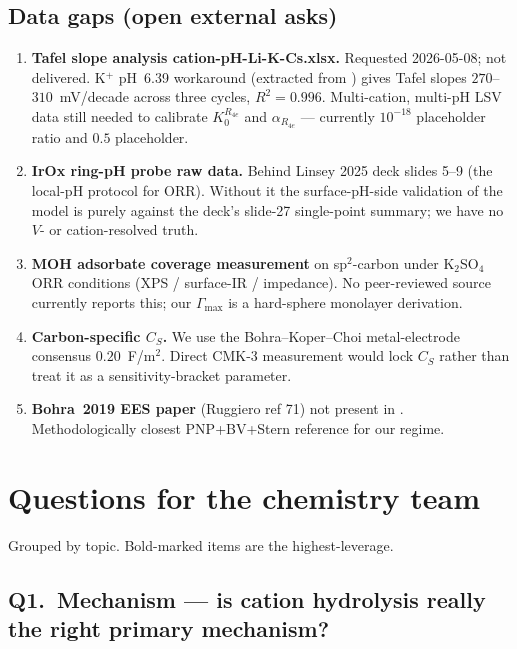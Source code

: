 \documentclass[11pt]{article}
\begin{document}
\subsection{Data gaps (open external asks)}

\begin{enumerate}[leftmargin=*,nosep]
\item \textbf{Tafel slope analysis cation-pH-Li-K-Cs.xlsx.}  Requested
  2026-05-08; not delivered.  K$^+$ pH~6.39 workaround
  (extracted from ) gives Tafel
  slopes $270$--$310$~mV/decade across three cycles, $R^2=0.996$.
  Multi-cation, multi-pH LSV data still needed to calibrate
  $K_0^{R_{4e}}$ and $\alpha_{R_{4e}}$ ---  currently $10^{-18}$
  placeholder ratio and $0.5$ placeholder.
\item \textbf{IrOx ring-pH probe raw data.}  Behind Linsey 2025 deck
  slides 5--9 (the local-pH protocol for ORR).  Without it the
  surface-pH-side validation of the model is purely against the
  deck's slide-27 single-point summary; we have no $V$- or
  cation-resolved truth.
\item \textbf{MOH adsorbate coverage measurement} on sp$^2$-carbon
  under K$_2$SO$_4$ ORR conditions (XPS / surface-IR / impedance).
  No peer-reviewed source currently reports this; our $\Gamma_{\max}$
  is a hard-sphere monolayer derivation.
\item \textbf{Carbon-specific $C_S$.}  We use the Bohra--Koper--Choi
  metal-electrode consensus $0.20$~F/m$^2$.  Direct CMK-3 measurement
  would lock $C_S$ rather than treat it as a sensitivity-bracket
  parameter.
\item \textbf{Bohra~2019 EES paper} (Ruggiero ref 71) not present in
  .  Methodologically closest PNP+BV+Stern reference
  for our regime.
\end{enumerate}

\section{Questions for the chemistry team}
\label{sec:ask}

Grouped by topic.  Bold-marked items are the highest-leverage.

\subsection*{Q1.\ Mechanism --- is cation hydrolysis really the right primary mechanism?}
\end{document}
